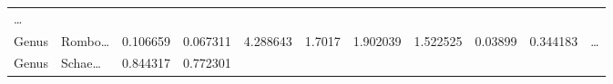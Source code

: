 \documentclass[
]{article}
\begin{document}
\begin{longtable}[]{@{}lllllllllll@{}}
\begin{minipage}[t]{0.03\columnwidth}
\ldots{}\strut
\end{minipage}\tabularnewline
\begin{minipage}[t]{0.06\columnwidth}\raggedright
Genus\strut
\end{minipage} & \begin{minipage}[t]{0.06\columnwidth}\raggedright
Rombo\ldots{}\strut
\end{minipage} & \begin{minipage}[t]{0.09\columnwidth}\raggedright
0.106659\strut
\end{minipage} & \begin{minipage}[t]{0.06\columnwidth}\raggedright
0.067311\strut
\end{minipage} & \begin{minipage}[t]{0.09\columnwidth}\raggedright
4.288643\strut
\end{minipage} & \begin{minipage}[t]{0.06\columnwidth}\raggedright
1.7017\strut
\end{minipage} & \begin{minipage}[t]{0.09\columnwidth}\raggedright
1.902039\strut
\end{minipage} & \begin{minipage}[t]{0.06\columnwidth}\raggedright
1.522525\strut
\end{minipage} & \begin{minipage}[t]{0.06\columnwidth}\raggedright
0.03899\strut
\end{minipage} & \begin{minipage}[t]{0.06\columnwidth}\raggedright
0.344183\strut
\end{minipage} & \begin{minipage}[t]{0.03\columnwidth}\raggedright
\ldots{}\strut
\end{minipage}\tabularnewline
\begin{minipage}[t]{0.06\columnwidth}\raggedright
Genus\strut
\end{minipage} & \begin{minipage}[t]{0.06\columnwidth}\raggedright
Schae\ldots{}\strut
\end{minipage} & \begin{minipage}[t]{0.09\columnwidth}\raggedright
0.844317\strut
\end{minipage} & \begin{minipage}[t]{0.06\columnwidth}\raggedright
0.772301\strut
\end{minipage} & \begin{minipage}[t]{0.09\columnwidth}\raggedright

\end{minipage}
\end{longtable}
\end{document}
